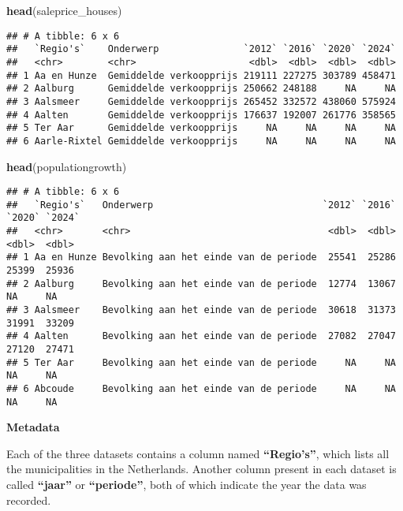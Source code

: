 \documentclass[
]{article}
\newenvironment{Shaded}{\begin{snugshade}}{\end{snugshade}}
\newcommand{\FunctionTok}[1]{\textcolor[rgb]{0.13,0.29,0.53}{\textbf{#1}}}
\newcommand{\NormalTok}[1]{#1}
\begin{document}
\begin{Shaded}
\begin{Highlighting}[]
\FunctionTok{head}\NormalTok{(saleprice\_houses)}
\end{Highlighting}
\end{Shaded}

\begin{verbatim}
## # A tibble: 6 x 6
##   `Regio's`    Onderwerp               `2012` `2016` `2020` `2024`
##   <chr>        <chr>                    <dbl>  <dbl>  <dbl>  <dbl>
## 1 Aa en Hunze  Gemiddelde verkoopprijs 219111 227275 303789 458471
## 2 Aalburg      Gemiddelde verkoopprijs 250662 248188     NA     NA
## 3 Aalsmeer     Gemiddelde verkoopprijs 265452 332572 438060 575924
## 4 Aalten       Gemiddelde verkoopprijs 176637 192007 261776 358565
## 5 Ter Aar      Gemiddelde verkoopprijs     NA     NA     NA     NA
## 6 Aarle-Rixtel Gemiddelde verkoopprijs     NA     NA     NA     NA
\end{verbatim}

\begin{Shaded}
\begin{Highlighting}[]
\FunctionTok{head}\NormalTok{(populationgrowth)}
\end{Highlighting}
\end{Shaded}

\begin{verbatim}
## # A tibble: 6 x 6
##   `Regio's`   Onderwerp                              `2012` `2016` `2020` `2024`
##   <chr>       <chr>                                   <dbl>  <dbl>  <dbl>  <dbl>
## 1 Aa en Hunze Bevolking aan het einde van de periode  25541  25286  25399  25936
## 2 Aalburg     Bevolking aan het einde van de periode  12774  13067     NA     NA
## 3 Aalsmeer    Bevolking aan het einde van de periode  30618  31373  31991  33209
## 4 Aalten      Bevolking aan het einde van de periode  27082  27047  27120  27471
## 5 Ter Aar     Bevolking aan het einde van de periode     NA     NA     NA     NA
## 6 Abcoude     Bevolking aan het einde van de periode     NA     NA     NA     NA
\end{verbatim}

\textbf{Metadata}

Each of the three datasets contains a column named
\textbf{``\textbf{Regio's}''}, which lists all the municipalities in the
Netherlands. Another column present in each dataset is called
\textbf{``\textbf{jaar}''} or \textbf{``\textbf{periode}''}, both of
which indicate the year the data was recorded.
\end{document}
